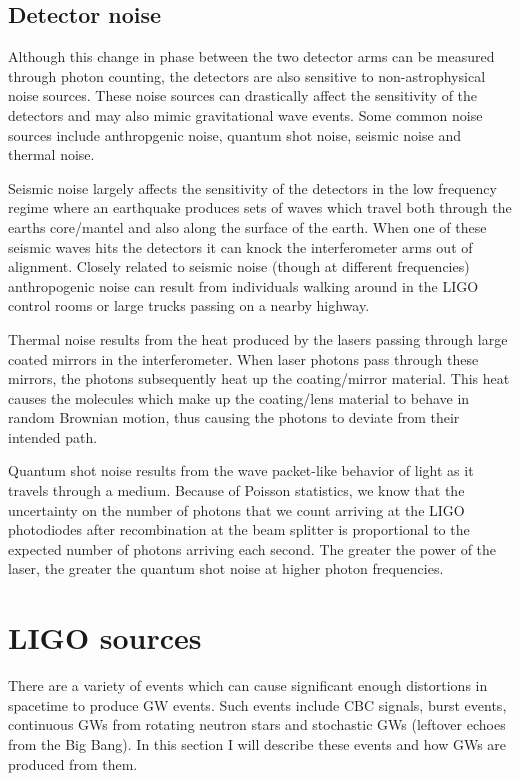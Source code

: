 \subsection{Detector noise}

Although this change in phase between 
the two detector arms can be measured through 
photon counting, the detectors are 
also sensitive to non-astrophysical noise 
sources. These noise sources can drastically affect 
the sensitivity of the detectors and may also mimic 
gravitational wave events. Some common noise sources 
include anthropgenic noise, quantum shot noise, 
seismic noise and thermal noise. 

Seismic noise largely affects the sensitivity of 
the detectors in the low frequency regime where 
an earthquake produces sets of waves which travel both 
through the earths core/mantel and also along the 
surface of the earth. When one of these seismic waves 
hits the detectors it can knock the interferometer arms 
out of alignment. Closely related to seismic noise 
(though at different frequencies) anthropogenic noise 
can result from individuals walking around in the 
\ac{LIGO} control rooms or large trucks passing 
on a nearby highway.

%
%
Thermal noise results from the heat produced by 
the lasers passing through large coated mirrors in 
the interferometer. When laser photons pass through 
these mirrors, the photons subsequently heat up 
the coating/mirror material. This heat causes the molecules 
which make up the coating/lens material to behave in 
random Brownian motion, thus causing the photons to deviate from 
their intended path.

Quantum shot noise results from the wave packet-like 
behavior of light as it travels through a medium. 
Because of Poisson statistics, we know that the 
uncertainty on the number of photons that we 
count arriving at the \ac{LIGO} photodiodes 
after recombination at the beam splitter is 
proportional to the expected number of photons 
arriving each second. The greater the power 
of the laser, the greater the quantum shot 
noise at higher photon frequencies.

\section{LIGO sources}

There are a variety of events which can cause significant 
enough distortions in spacetime to produce 
\ac{GW} events. Such events include \ac{CBC} signals, burst events,
continuous \ac{GW}s from rotating neutron stars and 
stochastic \ac{GW}s (leftover echoes from the Big Bang). In this 
section I will describe these events and how \ac{GW}s are 
produced from them.


